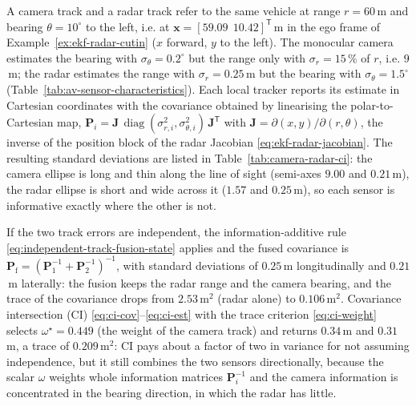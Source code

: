 \documentclass[graybox,envcountchap]{style/SNmono}
\DeclareMathOperator{\diag}{diag}
\begin{document}
\begin{example}
\label{ex:camera-radar-ci}
A camera track and a radar track refer to the same vehicle at range $r=60$\,m and bearing $\theta=10^{\circ}$ to the left, i.e. at $\mathbf{x}=[59.09\ \ 10.42]^{\mathsf T}$\,m in the ego frame of Example~\ref{ex:ekf-radar-cutin} ($x$ forward, $y$ to the left). The monocular camera estimates the bearing with $\sigma_{\theta}=0.2^{\circ}$ but the range only with $\sigma_{r}=15$\,\% of $r$, i.e. $9$\,m; the radar estimates the range with $\sigma_{r}=0.25$\,m but the bearing with $\sigma_{\theta}=1.5^{\circ}$ (Table~\ref{tab:av-sensor-characteristics}). Each local tracker reports its estimate in Cartesian coordinates with the covariance obtained by linearising the polar-to-Cartesian map, $\mathbf{P}_{i}=\mathbf{J}\,\diag(\sigma_{r,i}^{2},\sigma_{\theta,i}^{2})\,\mathbf{J}^{\mathsf T}$ with $\mathbf{J}=\partial(x,y)/\partial(r,\theta)$, the inverse of the position block of the radar Jacobian \eqref{eq:ekf-radar-jacobian}. The resulting standard deviations are listed in Table~\ref{tab:camera-radar-ci}: the camera ellipse is long and thin along the line of sight (semi-axes $9.00$ and $0.21$\,m), the radar ellipse is short and wide across it ($1.57$ and $0.25$\,m), so each sensor is informative exactly where the other is not.

If the two track errors are independent, the information-additive rule \eqref{eq:independent-track-fusion-state} applies and the fused covariance is $\mathbf{P}_{\mathrm{f}}=(\mathbf{P}_{1}^{-1}+\mathbf{P}_{2}^{-1})^{-1}$, with standard deviations of $0.25$\,m longitudinally and $0.21$\,m laterally: the fusion keeps the radar range and the camera bearing, and the trace of the covariance drops from $2.53$\,m$^{2}$ (radar alone) to $0.106$\,m$^{2}$. Covariance intersection (CI) \eqref{eq:ci-cov}--\eqref{eq:ci-est} with the trace criterion \eqref{eq:ci-weight} selects $\omega^{\star}=0.449$ (the weight of the camera track) and returns $0.34$\,m and $0.31$\,m, a trace of $0.209$\,m$^{2}$: CI pays about a factor of two in variance for not assuming independence, but it still combines the two sensors directionally, because the scalar $\omega$ weights whole information matrices $\mathbf{P}_{i}^{-1}$ and the camera information is concentrated in the bearing direction, in which the radar has little.


\end{example}
\end{document}
